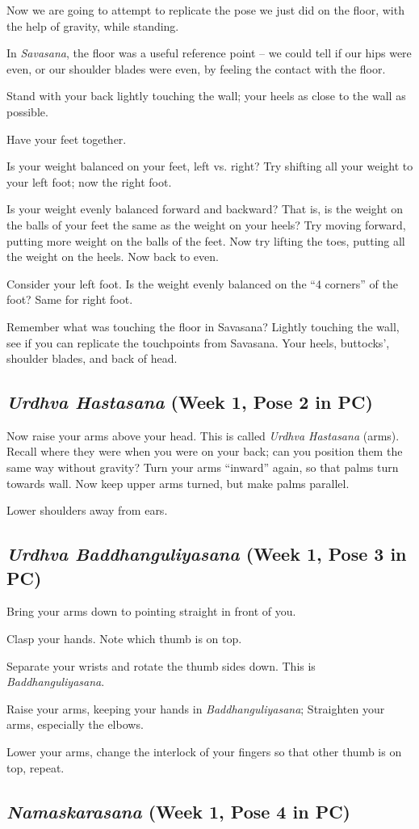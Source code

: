 \documentclass{book}
\newcommand{\apose}[1]{\emph{#1}}
\newcommand{\badd}{\apose{Baddhanguliyasana}}
\newcommand{\nam}{\apose{Namaskarasana}}
\newcommand{\sav}{\apose{Savasana}}
\newcommand{\urdbad}{\apose{Urdhva Baddhanguliyasana}}
\newcommand{\urdhast}{\apose{Urdhva Hastasana}}
\newcommand{\PC}[2]{{\normalfont\normalsize \hfill(Week #1, Pose #2 in PC)}}
\newcommand{\newpose}[1]{{{#1}}}
\newcounter{pose}
\newcommand{\pose}{\subsection}
\begin{document}
 Now we are going to attempt to replicate the pose we just did
 on the floor, with the help of gravity, while standing.

In \sav{}, the floor was a useful reference point -- we
could tell if our hips were even, or our shoulder blades were
even, by feeling the contact with the floor.

Stand with your back lightly touching the wall; your heels as
close to the wall as possible.

Have your feet together.

Is your weight balanced on your feet, left vs. right? Try
shifting all your weight to your left foot; now the right foot.

Is your weight evenly balanced forward and backward? That is, is the
weight on the balls of your feet the same as the weight on your heels?
Try moving forward, putting more weight on the balls of the feet. Now
try lifting the toes, putting all the weight on the heels. Now back to
even.

Consider your left foot. Is the weight evenly balanced on the ``4
corners'' of the foot? Same for right foot.

Remember what was touching the floor in Savasana? Lightly touching the
wall, see if you can replicate the touchpoints from Savasana. Your
heels, buttocks', shoulder blades, and back of head.


\pose{\newpose{\urdhast{}} \PC{1}{2}}

Now raise your arms above your head. This is called \urdhast{}
(arms). Recall where they were when you were on your back; can you
position them the same way without gravity? Turn your arms ``inward''
again, so that palms turn towards wall. Now keep upper arms turned,
but make palms parallel.

Lower shoulders away from ears.

\pose{\newpose{\urdbad{}} \PC{1}{3}}

Bring your arms down to pointing straight in front of you.

Clasp your hands. Note which thumb is on top.

Separate your wrists and rotate the thumb sides down. This is \badd{}.

Raise your arms, keeping your hands in \badd{}; Straighten your arms,
especially the elbows.

Lower your arms, change the interlock of your fingers so that other
thumb is on top, repeat.


\pose{\newpose{\nam{}} \PC{1}{4}}
\end{document}
